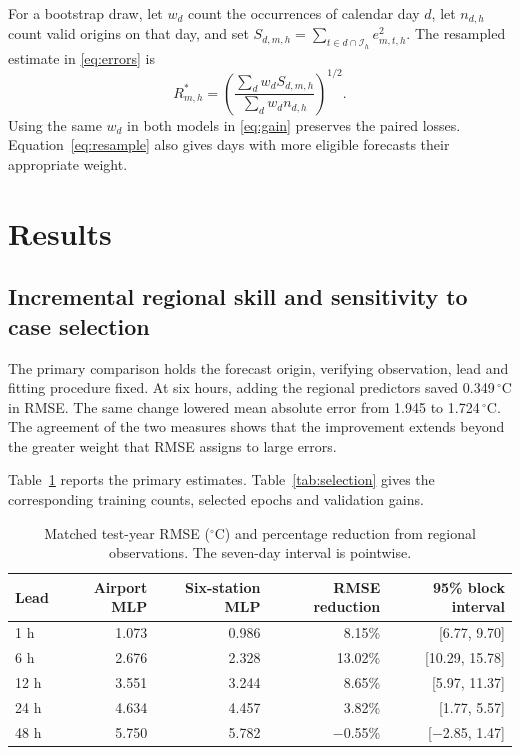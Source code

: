 \documentclass[11pt,letterpaper]{article}
\newcommand{\thead}[1]{\textbf{#1}}\newcommand{\bestscore}[1]{\textbf{#1}}
\newcommand{\celsius}{\ensuremath{^{\circ}\mathrm{C}}}\newcommand{\code}[1]{\texttt{\small #1}}
\begin{document}
For a bootstrap draw, let $w_d$ count the occurrences of calendar day $d$, let $n_{d,h}$ count valid origins on that day, and set $S_{d,m,h}=\sum_{t\in d\cap\mathcal I_h}e_{m,t,h}^2$. The resampled estimate in \eqref{eq:errors} is
\begin{equation}\label{eq:resample}
 R^*_{m,h}=\left(\frac{\sum_d w_d S_{d,m,h}}{\sum_d w_d n_{d,h}}\right)^{1/2}.
\end{equation}
Using the same $w_d$ in both models in \eqref{eq:gain} preserves the paired losses. Equation~\eqref{eq:resample} also gives days with more eligible forecasts their appropriate weight.


\FloatBarrier
\section{Results}\label{results}


\subsection{Incremental regional skill and sensitivity to case selection}\label{matched}
The primary comparison holds the forecast origin, verifying observation, lead and fitting procedure fixed. At six hours, adding the regional predictors saved 0.349\,\celsius{} in RMSE. The same change lowered mean absolute error from 1.945 to 1.724\,\celsius. The agreement of the two measures shows that the improvement extends beyond the greater weight that RMSE assigns to large errors.

Table~\ref{tab:main} reports the primary estimates. Table~\ref{tab:selection} gives the corresponding training counts, selected epochs and validation gains.



\begin{table}[!htbp]
\centering\small
\caption{Matched test-year RMSE (\celsius) and percentage reduction from regional observations. The seven-day interval is pointwise.}\label{tab:main}
\renewcommand{\arraystretch}{1.12}\begin{tabular*}{.97\linewidth}{@{\extracolsep{\fill}}lrrrr@{}}\toprule
\thead{Lead} & \thead{Airport MLP} & \thead{Six-station MLP} & \thead{RMSE reduction} & \thead{95\% block interval}\\\midrule
1 h & 1.073 & 0.986 & 8.15\% & [6.77, 9.70] \\
6 h & 2.676 & 2.328 & 13.02\% & [10.29, 15.78] \\
12 h & 3.551 & 3.244 & 8.65\% & [5.97, 11.37] \\
24 h & 4.634 & 4.457 & 3.82\% & [1.77, 5.57] \\
48 h & 5.750 & 5.782 & −0.55\% & [−2.85, 1.47] \\
\bottomrule\end{tabular*}
\end{table}
\end{document}
